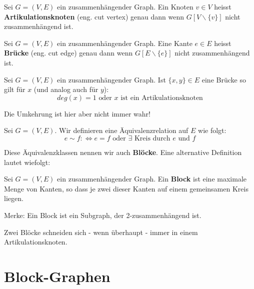 \documentclass[a4paper]{report}
\begin{document}
\begin{tcolorbox}[colframe=dcBlue,title=Definition]
    Sei $G = (V,E)$ ein zusammenhängender Graph. Ein Knoten $v \in V$ heisst \textbf{Artikulationsknoten}
    (eng. cut vertex) genau dann wenn $G[V \backslash \{v\}]$ nicht zusammenhängend ist.
\end{tcolorbox}

\begin{tcolorbox}[colframe=dcBlue,title=Definition]
    Sei $G = (V,E)$ ein zusammenhängender Graph. Eine Kante $e \in E$ heisst \textbf{Brücke}
    (eng. cut edge) genau dann wenn $G[E \backslash \{e\}]$ nicht zusammenhängend ist.
\end{tcolorbox}

\begin{tcolorbox}[colframe=dcGreen,title=Es Gilt]
    Sei $G = (V,E)$ ein zusammenhängender Graph. Ist $\{x,y\} \in E$ eine Brücke so gilt für $x$
    (und analog auch für $y$): \\
    $$deg(x) = 1 \text{    oder    } x \text{ ist ein Artikulationsknoten}$$
\end{tcolorbox}
\bigskip

Die Umkehrung ist hier aber nicht immer wahr!

\begin{tcolorbox}[colframe=dcBlue,title=Definition]
    Sei $G = (V,E)$. Wir definieren eine Äquivalenzrelation auf $E$ wie folgt:
    $$e \sim f: \Leftrightarrow e = f \text{  oder  } \exists \text{ Kreis durch } e \text{ und } f$$
\end{tcolorbox}
\bigskip

Diese Äquivalenzklassen nennen wir auch \textbf{Blöcke}. Eine alternative Definition lautet wiefolgt:

\begin{tcolorbox}[colframe=dcBlue,title=Definition]
    Sei $G = (V,E)$ ein zusammenhängender Graph. Ein \textbf{Block} ist eine maximale Menge von Kanten, so
    dass je zwei dieser Kanten auf einem gemeinsamen Kreis liegen.
\end{tcolorbox}
\bigskip

Merke: Ein Block ist ein Subgraph, der 2-zusammenhängend ist.

\begin{tcolorbox}[colframe=dcGreen,title=Es Gilt]
    Zwei Blöcke schneiden sich - wenn überhaupt - immer in einem Artikulationsknoten.
\end{tcolorbox}
\bigskip

\section{Block-Graphen}
\end{document}
